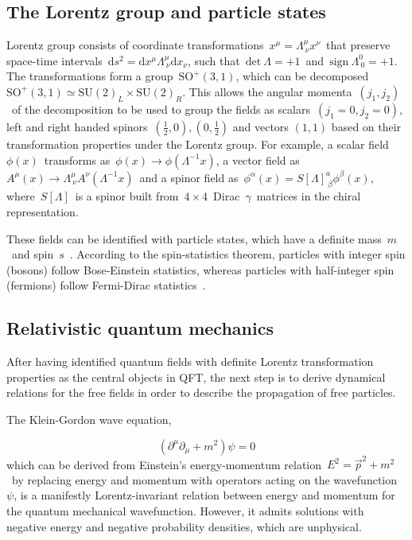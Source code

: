 \subsection{The Lorentz group and particle states}

Lorentz group consists of coordinate transformations~$x^\mu = \Lambda^{\mu}_{\ \nu} x^\nu$~that preserve space-time intervals~$\mathrm{d}s^2 = \mathrm{d}x^\mu \Lambda^\mu_{\ \nu} \mathrm{d}x_\nu$, such that~$\mathrm{det}\ \Lambda = +1$~and~$\mathrm{sign}\ \Lambda^0_{\ 0} = +1$. The transformations form a group~$\mathrm{SO}^+(3,1)$, which can be decomposed~$\mathrm{SO}^+(3,1) \simeq \mathrm{SU}(2)_L \times \mathrm{SU}(2)_R$. This allows the angular momenta~$(j_1, j_2)$~of the decomposition to be used to group the fields as scalars~$(j_1=0, j_2=0)$, left and right handed spinors~$(\frac{1}{2}, 0), (0, \frac{1}{2})$ and vectors $(1, 1)$ based on their transformation properties under the Lorentz group. For example, a scalar field~$\phi(x)$~transforms as~$\phi(x) \rightarrow \phi(\Lambda^{-1} x)$, a vector field as~$A^\mu(x) \rightarrow \Lambda^\mu_{\ \nu} A^\nu(\Lambda^{-1}x)$~and a spinor field as~$\phi^\alpha(x) = S[\Lambda]^a_{\ \beta} \phi^\beta(x)$, where~$S[\Lambda]$~is a spinor built from~$4\times4$~Dirac~$\gamma$~matrices in the chiral representation.

These fields can be identified with particle states, which have a definite mass~$m$~and spin~$s$~\cite{wigner1939unitary}. According to the spin-statistics theorem, particles with integer spin (bosons) follow Bose-Einstein statistics, whereas particles with half-integer spin (fermions) follow Fermi-Dirac statistics~\cite{pauli1940connection}. 

\subsection{Relativistic quantum mechanics}
After having identified quantum fields with definite Lorentz transformation properties as the central objects in QFT, the next step is to derive dynamical relations for the free fields in order to describe the propagation of free particles.

The Klein-Gordon wave equation,

\begin{equation}
\label{eq:theory_klein_gordon}
(\partial^\mu \partial_\mu + m^2) \psi = 0
\end{equation}
which can be derived from Einstein's energy-momentum relation~$E^2 = \vec{p}^2 + m^2$~by replacing energy and momentum with operators acting on the wavefunction~$\psi$, is a manifestly Lorentz-invariant relation between energy and momentum for the quantum mechanical wavefunction. However, it admits solutions with negative energy and negative probability densities, which are unphysical.

